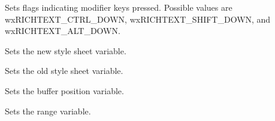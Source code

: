 \label{wxrichtexteventsetflags}


Sets flags indicating modifier keys pressed. Possible values are wxRICHTEXT\_CTRL\_DOWN,
wxRICHTEXT\_SHIFT\_DOWN, and wxRICHTEXT\_ALT\_DOWN.

\label{wxrichtexteventsetnewstylesheet}


Sets the new style sheet variable.

\label{wxrichtexteventsetoldstylesheet}


Sets the old style sheet variable.

\label{wxrichtexteventsetposition}


Sets the buffer position variable.

\label{wxrichtexteventsetrange}


Sets the range variable.

